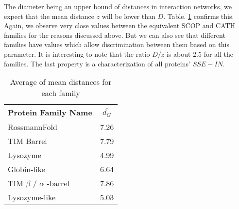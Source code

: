 The diameter being an upper bound of distances in interaction networks, we expect that the mean distance $z$ will be lower than $D$. Table. \ref{tab:average_mean_distance} confirms this. Again, we observe very close values between the equivalent SCOP and CATH families for the reasons discussed above. But we can also see that different families have values which allow discrimination between them based on this parameter. It is interesting to note that the ratio $D / z$ is about $2.5$ for all the families. The last property is a characterization of all proteins' $SSE-IN$.
\begin{table}
\centering
\begin {tabular}{ | l | c |}
\hline
Protein Family Name & $\overline{d_G}$ \\ \hline
RossmannFold & 7.26 \\ \hline
TIM Barrel & 7.79 \\ \hline
Lysozyme & 4.99 \\ \hline
\hline
Globin-like & 6.64 \\ \hline
TIM $\beta$ / $\alpha$ -barrel & 7.86 \\ \hline
Lysozyme-like & 5.03 \\ \hline
\end {tabular}
\caption {Average of mean distances for each family}
\label {tab:average_mean_distance}
\end{table}
